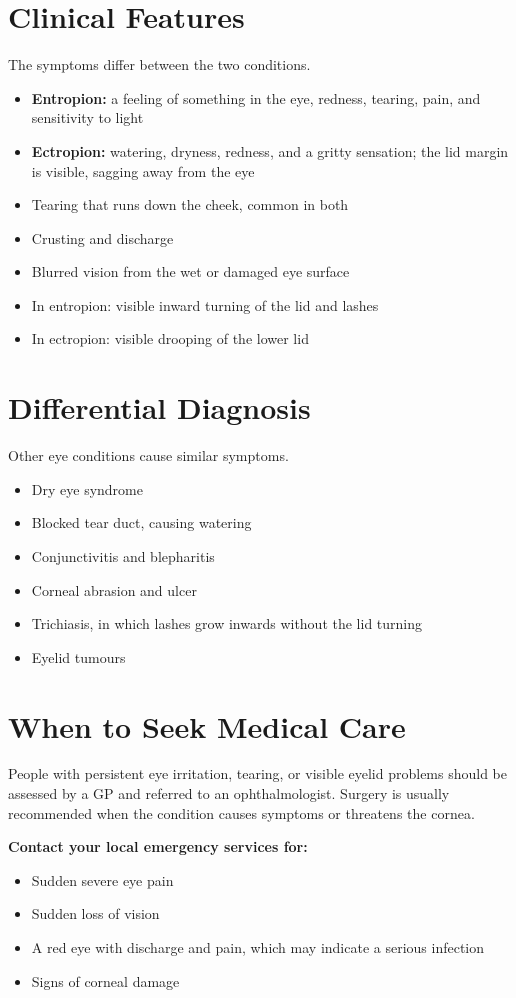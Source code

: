 \section*{Clinical Features}
The symptoms differ between the two conditions.
\begin{itemize}
    \item \textbf{Entropion:} a feeling of something in the eye, redness, tearing, pain, and sensitivity to light
    \item \textbf{Ectropion:} watering, dryness, redness, and a gritty sensation; the lid margin is visible, sagging away from the eye
    \item Tearing that runs down the cheek, common in both
    \item Crusting and discharge
    \item Blurred vision from the wet or damaged eye surface
    \item In entropion: visible inward turning of the lid and lashes
    \item In ectropion: visible drooping of the lower lid
\end{itemize}

\section*{Differential Diagnosis}
Other eye conditions cause similar symptoms.
\begin{itemize}
    \item Dry eye syndrome
    \item Blocked tear duct, causing watering
    \item Conjunctivitis and blepharitis
    \item Corneal abrasion and ulcer
    \item Trichiasis, in which lashes grow inwards without the lid turning
    \item Eyelid tumours
\end{itemize}

\section*{When to Seek Medical Care}
People with persistent eye irritation, tearing, or visible eyelid problems should be assessed by a GP and referred to an ophthalmologist. Surgery is usually recommended when the condition causes symptoms or threatens the cornea.

\textbf{Contact your local emergency services for:}
\begin{itemize}
    \item Sudden severe eye pain
    \item Sudden loss of vision
    \item A red eye with discharge and pain, which may indicate a serious infection
    \item Signs of corneal damage
\end{itemize}

